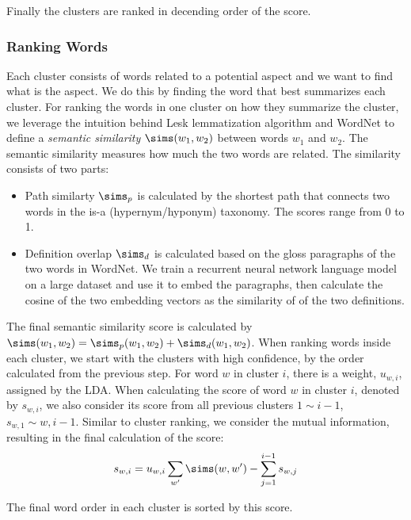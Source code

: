 Finally the clusters are ranked in decending order of the score. 

\subsubsection{Ranking Words}
\label{section:ranking_words}

Each cluster consists of words related to a potential aspect and we want 
to find what is the aspect. We do this by finding the word that best 
summarizes each cluster. For ranking the words in one cluster on how they 
summarize the cluster, we leverage the intuition behind Lesk 
lemmatization algorithm and WordNet to 
define a \emph{semantic similarity} $\sims(w_1, w_2)$ between words $w_1$ and $w_2$.
The semantic similarity measures how much the two words are related. 
The similarity consists of two parts:

\begin{itemize}
    \item Path similarty $\sims_p$ is calculated by the shortest path that connects two words in the is-a (hypernym/hyponym) taxonomy. The scores range from 0 to 1. 
    \item Definition overlap $\sims_d$ is calculated based on 
the gloss paragraphs of the two words in WordNet. 
We train a recurrent neural network language model on a large dataset 
and use it to embed the paragraphs, then calculate the cosine of the two embedding vectors as the similarity of of the two definitions.
\end{itemize}

The final semantic similarity score is calculated by $\sims(w_1, w_2) = \sims_p(w_1, w_2) + \sims_d(w_1, w_2)$. When ranking words inside each cluster, we start with the clusters with high confidence, by the order calculated from the previous step. For word $w$ in cluster $i$, there is a weight, $u_{w,i}$, assigned by the LDA. When calculating the score of word $w$ in cluster $i$, denoted by $s_{w,i}$, we also consider its score from all previous clusters $1\sim i-1$, $s_{w,1} \sim {w,i-1}$. Similar to cluster ranking, we consider the mutual information, resulting in the final calculation of the score:
$$s_{w,i} = u_{w,i} \sum_{w'} \sims(w, w') - \sum_{j=1}^{i-1} s_{w,j}$$

The final word order in each cluster is sorted by this score.
